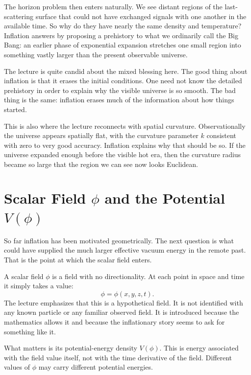 The horizon problem then enters naturally. We see distant regions of the last-scattering surface that could not have exchanged signals with one another in the available time. So why do they have nearly the same density and temperature? Inflation answers by proposing a prehistory to what we ordinarily call the Big Bang: an earlier phase of exponential expansion stretches one small region into something vastly larger than the present observable universe.

The lecture is quite candid about the mixed blessing here. The good thing about inflation is that it erases the initial conditions. One need not know the detailed prehistory in order to explain why the visible universe is so smooth. The bad thing is the same: inflation erases much of the information about how things started.

This is also where the lecture reconnects with spatial curvature. Observationally the universe appears spatially flat, with the curvature parameter \(k\) consistent with zero to very good accuracy. Inflation explains why that should be so. If the universe expanded enough before the visible hot era, then the curvature radius became so large that the region we can see now looks Euclidean.

\section{Scalar Field \(\phi\) and the Potential \(V(\phi)\)}

So far inflation has been motivated geometrically. The next question is what could have supplied the much larger effective vacuum energy in the remote past. That is the point at which the scalar field enters.

A scalar field \(\phi\) is a field with no directionality. At each point in space and time it simply takes a value:
\begin{equation}
\phi=\phi(x,y,z,t).
\end{equation}
The lecture emphasizes that this is a hypothetical field. It is not identified with any known particle or any familiar observed field. It is introduced because the mathematics allows it and because the inflationary story seems to ask for something like it.

What matters is its potential-energy density \(V(\phi)\). This is energy associated with the field value itself, not with the time derivative of the field. Different values of \(\phi\) may carry different potential energies.

